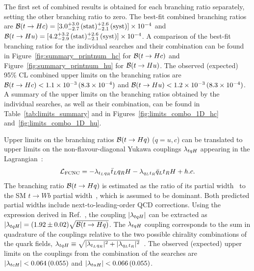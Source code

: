 The first set of combined results is obtained for each branching ratio separately, setting the other branching ratio to zero.
The best-fit combined branching ratios are $\mathcal{B}(t\to Hc)=[3.0^{+3.0}_{-2.7}\,(\mathrm{stat})^{+2.6}_{-2.1}\,(\mathrm{syst})] \times 10^{-4}$ and 
$\mathcal{B}(t\to Hu)=[4.2^{+3.2}_{-2.9}\,(\mathrm{stat})^{+2.6}_{-2.1}\,(\mathrm{syst})] \times 10^{-4}$.  
A comparison of the best-fit branching ratios for the individual searches and their combination can be found in Figure~\ref{fig:summary_printnum_hc} 
for $\mathcal{B}(t\to Hc)$ and Figure~\ref{fig:summary_printnum_hu} for $\mathcal{B}(t\to Hu)$.
The observed (expected) 95\% CL combined upper limits on the branching ratios are 
$\mathcal{B}(t\to Hc)<1.1 \times 10^{-3}\,(8.3 \times 10^{-4})$ and $\mathcal{B}(t\to Hu)<1.2 \times 10^{-3}\,(8.3 \times 10^{-4})$.
A summary of the upper limits on the branching ratios obtained by the individual searches, as well as their combination, 
can be found 
in Table~\ref{tab:limits_summary} and in Figures~\ref{fig:limits_combo_1D_hc} and~\ref{fig:limits_combo_1D_hu}.


Upper limits on the branching ratios $\mathcal{B}(t\to Hq)$ ($q=u,c$) can be translated to upper limits on the non-flavour-diagonal Yukawa couplings $\lambda_{tqH}$ 
appearing in the Lagrangian~\cite{Harnik:2012pb}:
\begin{equation*}
{\cal L}_\mathrm{FCNC} = -\lambda_{t_L q_R} \bar{t}_L q_R H - \lambda_{q_L t_R} \bar{q}_L t_R H  + h.c.
\end{equation*}
The branching ratio $\mathcal{B}(t\to Hq)$ is estimated as the ratio of its partial width~\cite{Zhang:2013xya} to the SM $t \to Wb$ partial width~\cite{Denner:1990ns}, 
which is assumed to be dominant. Both predicted partial widths include next-to-leading-order QCD corrections.
Using the expression derived in Ref.~\cite{Aad:2014dya}, the coupling $|\lambda_{tqH}|$ can be extracted as $| \lambda_{tqH} | = (1.92 \pm 0.02) \sqrt{\mathcal{B}(t\to Hq)}$.
The $\lambda_{tqH}$ coupling corresponds to the sum in quadrature of the couplings relative to the two possible chirality combinations of the quark fields, 
$\lambda_{tqH} \equiv \sqrt{ |\lambda_{t_Lq_R}|^2 +   |\lambda_{q_L t_R}|^2 }$~\cite{Harnik:2012pb}.
The observed (expected) upper limits on the couplings from the combination of the searches are $|\lambda_{tcH}|<0.064\,(0.055)$ and $|\lambda_{tuH}|<0.066\,(0.055)$.

